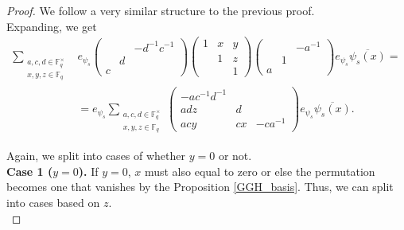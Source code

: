 \documentclass[12pt,reqno]{amsart}
\theoremstyle{definition}
\theoremstyle{remark}
\numberwithin{equation}{section}
\begin{document}
\begin{proof}
    We follow a very similar structure to the previous proof.\\

    Expanding, we get
    \begin{align*}
        \sum_{\substack{a, c, d \in \mathbb{F}_q^\times\\x, y, z \in \mathbb{F}_q}}& e_{\psi_s}
        \begin{pmatrix}
            & & -d^{-1}c^{-1}\\
            & d & \\
            c & &
        \end{pmatrix} \begin{pmatrix}
            1 & x & y\\
            & 1 & z\\
            & & 1
        \end{pmatrix} \begin{pmatrix}
                & & -a^{-1}\\
                & 1 &\\
                a & &
        \end{pmatrix} e_{\psi_s} \overline{\psi_s(x)}=\\
        &= e_{\psi_s} \sum_{\substack{a, c, d \in \mathbb{F}_q^\times\\x, y, z \in \mathbb{F}_q}} \begin{pmatrix}
            -ac^{-1}d^{-1} & &\\
            adz & d & \\
            acy & cx & -ca^{-1}
        \end{pmatrix} e_{\psi_s} \overline{\psi_s(x)}.
    \end{align*}

    Again, we split into cases of whether $y = 0$ or not.\\

    \textbf{Case 1 ($y = 0$).} If $y = 0$, $x$ must also equal to zero or else the permutation becomes one that vanishes by the Proposition \ref{GGH_basis}. Thus, we can split into cases based on $z$.\\


\end{proof}
\end{document}
